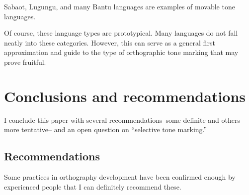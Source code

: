 \documentclass[output=paper]{langscibook}
\begin{document}
Sabaot, Lugungu, and many Bantu languages are examples of movable tone languages. 

Of course, these language types are prototypical. Many languages do not fall neatly into these categories. However, this can serve as a general first approximation and guide to the type of orthographic tone marking that may prove fruitful.

\section{Conclusions and recommendations}\label{sec:Conclusion:5}

I conclude this paper with several recommendations–some definite and others more tentative– and an open question on “selective tone marking.” 

\subsection{Recommendations}
\label{sec:Conclusions:Recommendations:1}
Some practices in orthography development have been confirmed enough by experienced people that I can definitely recommend these.
\end{document}
